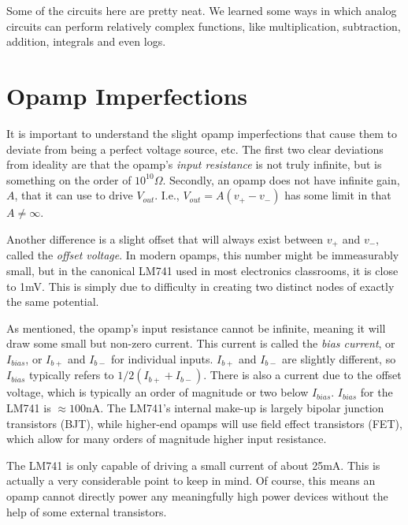 \documentclass[12pt]{report}
\newcommand{\Vo}{{V}_{out}}
\begin{document}
Some of the circuits here are pretty neat. We learned some ways in which analog circuits can perform relatively complex functions, like multiplication, subtraction, addition, integrals and even logs. 


\section{Opamp Imperfections}

It is important to understand the slight opamp imperfections that cause them to deviate from being a perfect voltage source, etc. The first two clear deviations from ideality are that the opamp's \textit{input resistance} is not truly infinite, but is something on the order of $10^{10}\Omega$. Secondly, an opamp does not have infinite gain, $A$, that it can use to drive $\Vo$. I.e., $\Vo = A(v_+ - v_-)$ has some limit in that $A \neq \infty$.\newline

Another difference is a slight offset that will always exist between $v_+$ and $v_-$, called the \textit{offset voltage}. In modern opamps, this number might be immeasurably small, but in the canonical LM741 used in most electronics classrooms, it is close to 1mV. This is simply due to difficulty in creating two distinct nodes of exactly the same potential. \newline

As mentioned, the opamp's input resistance cannot be infinite, meaning it will draw some small but non-zero current. This current is called the \textit{bias current}, or $I_{bias}$, or $I_{b+}$ and $I_{b-}$ for individual inputs. $I_{b+}$ and $I_{b-}$ are slightly different, so $I_{bias}$ typically refers to $1/2 (I_{b+} + I_{b-})$. There is also a current due to the offset voltage, which is typically an order of magnitude or two below $I_{bias}$. $I_{bias}$ for the LM741 is $\approx 100$nA. The LM741's internal make-up is largely bipolar junction transistors (BJT), while higher-end opamps will use field effect transistors (FET), which allow for many orders of magnitude higher input resistance. \newline

The LM741 is only capable of driving a small current of about 25mA. This is actually a very considerable point to keep in mind. Of course, this means an opamp cannot directly power any meaningfully high power devices without the help of some external transistors.\newline
\end{document}

